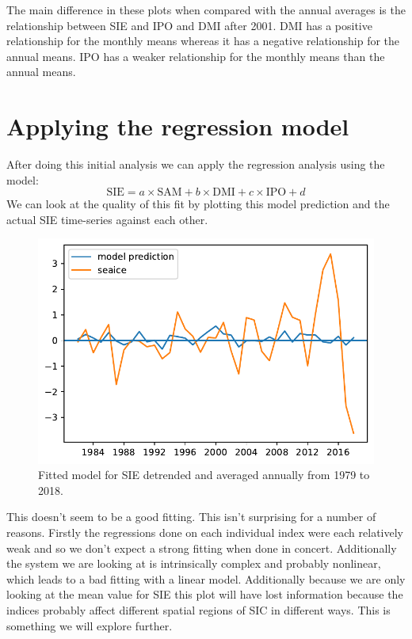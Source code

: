 The main difference in these plots when compared with the annual averages is the relationship between SIE and IPO and DMI after 2001. DMI has a positive relationship for the monthly means whereas it has a negative relationship for the annual means. IPO has a weaker relationship for the monthly means than the annual means.
\section{Applying the regression model}
After doing this initial analysis we can apply the regression analysis using the model:
$$
\text{SIE} = a\times\text{SAM} + b\times\text{DMI} + c \times\text{IPO} + d
$$
We can look at the quality of this fit by plotting this model prediction and the actual SIE time-series against each other.
\begin{figure}[H]
    \centering
    \includegraphics{Images_3.0/regressions/multivariate_model_anomalous_n1_annually_detrended_1979_2018.pdf}
    \caption{Fitted model for SIE detrended and averaged annually from 1979 to 2018.}
    \label{fig:multivariate_model_anomalous_n1_annually_detrended_1979_2018}
\end{figure}
This doesn't seem to be a good fitting. This isn't surprising for a number of reasons. Firstly the regressions done on each individual index were each relatively weak and so we don't expect a strong fitting when done in concert. Additionally the system we are looking at is intrinsically complex and probably nonlinear, which leads to a bad fitting with a linear model. Additionally because we are only looking at the mean value for SIE this plot will have lost information because the indices probably affect different spatial regions of SIC in different ways. This is something we will explore further.
